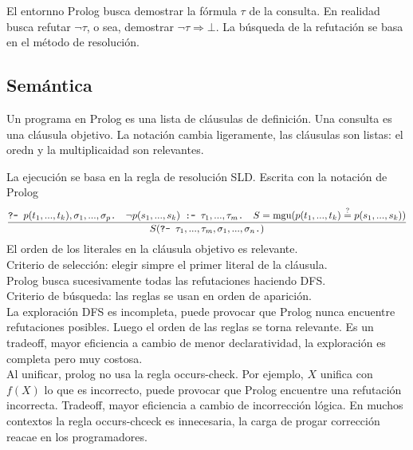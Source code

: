 \documentclass[12pt]{extarticle}
\def\equ{\overset{?}{=}}
\def\ssspace{\space\space\space}
\begin{document}
El entornno Prolog busca demostrar la fórmula $\tau$ de la consulta. En realidad busca refutar $\neg \tau$, o sea, demostrar $\neg\tau\Rightarrow\bot$. La búsqueda de la refutación se basa en el método de resolución.

\subsection{Semántica}
Un programa en Prolog es una lista de cláusulas de definición. Una consulta es una cláusula objetivo. La notación cambia ligeramente, las cláusulas son listas: el oredn y la multiplicaidad son relevantes.

La ejecución se basa en la regla de resolución SLD. Escrita con la notación de Prolog
$$\frac{
  \texttt{?- }p(t_1,...,t_k),\sigma_1,...,\sigma_p\texttt{.}
  \text{\ssspace} 
  \neg p(s_1,...,s_k)\texttt{ :- }\tau_1,...,\tau_m\texttt{.} 
  \text{\ssspace} 
  S = \text{mgu}(p(t_1,...,t_k) \equ p(s_1,...,s_k))
}{S(\texttt{?- }\tau_1,...,\tau_m,\sigma_1,...,\sigma_n\texttt{.})}
$$
El orden de los literales en la cláusula objetivo es relevante. \\
Criterio de selección: elegir simpre el primer literal de la cláusula. \\
Prolog busca sucesivamente todas las refutaciones haciendo DFS. \\
Criterio de búsqueda: las reglas se usan en orden de aparición. \\
La exploración DFS es incompleta, puede provocar que Prolog nunca encuentre refutaciones posibles. Luego el orden de las reglas se torna relevante. Es un tradeoff, mayor eficiencia a cambio de menor declaratividad, la exploración es completa pero muy costosa. \\
Al unificar, prolog no usa la regla occurs-check. Por ejemplo, $X$ unifica con $f(X)$ lo que es incorrecto, puede provocar que Prolog encuentre una refutación incorrecta. Tradeoff, mayor eficiencia a cambio de incorrección lógica. En muchos contextos la regla occurs-chceck es innecesaria, la carga de progar corrección reacae en los programadores. \\
\end{document}

